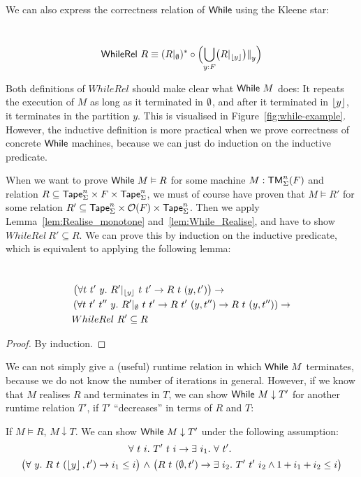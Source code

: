 We can also express the correctness relation of $\textsf{While}$ using the Kleene star:
\begin{lemma}
  ~
  \[
    \textsf{WhileRel}~R \equiv (R {|}_{\emptyset})^* \circ \Bigl( \bigcup_{y:F} \bigl( R {|}_{\left\lfloor {y} \right\rfloor} \bigr) {|\mkern-1.5mu|}_{y} \Bigr)
  \]
\end{lemma}

Both definitions of $WhileRel$ should make clear what $\textsf{While}~M$ does: It repeats the execution of $M$ as long as it terminated in $\emptyset$, and
after it terminated in $\left\lfloor {y} \right\rfloor$, it terminates in the partition $y$.  This is visualised in Figure~\ref{fig:while-example}.  However, the inductive
definition is more practical when we prove correctness of concrete $\textsf{While}$ machines, because we can just do induction on the inductive predicate.

When we want to prove $\textsf{While}~M \vDash R$ for some machine $M:\textsf{TM}_\Sigma^n(F)$ and relation
$R \subseteq \textsf{Tape}_\Sigma^n \times F \times \textsf{Tape}_\Sigma^n$, we must of course have proven that $M \vDash R'$ for some relation
$R' \subseteq \textsf{Tape}_\Sigma^n \times \mathcal{O}(F) \times \textsf{Tape}_\Sigma^n$.  Then we apply Lemma~\ref{lem:Realise_monotone} and~\ref{lem:While_Realise},
and have to show $WhileRel~R' \subseteq R$.  We can prove this by induction on the inductive predicate, which is equivalent to applying the following
lemma:
\begin{lemma}
  \label{lem:WhileInduction}
  ~
  \begin{alignat*}{1}
    & \left(\forall t~t'~y.~R' {|}_{\left\lfloor {y} \right\rfloor}~t~t' \rightarrow R~t~(y,t')\right) \rightarrow \\
    & \left(\forall t~t'~t''~y.~R'{|}_{\emptyset}~t~t' \rightarrow R~t'~(y, t'') \rightarrow R~t~(y,t'')\right) \rightarrow \\
    & WhileRel~R' \subseteq R
  \end{alignat*}
\end{lemma}
\begin{proof}
  By induction.
\end{proof}


We can not simply give a (useful) runtime relation in which $\textsf{While}~M$ terminates, because we do not know the number of iterations in general.
However, if we know that $M$ realises $R$ and terminates in $T$, we can show $\textsf{While}~M \downarrow T'$ for another runtime relation $T'$, if $T'$
``decreases'' in terms of $R$ and $T$:

\begin{lemma}
  \label{lem:While_TerminatesIn}
  If $M \vDash R$, $M \downarrow T$.  We can show $\textsf{While}~M \downarrow T'$ under the following assumption:
  \begin{multline*}
    \forall~t~i.~
    T'~t~i \rightarrow
    \exists~i_1.~
    \forall~t'.~ \\
    \bigl(
    \forall~y.~ R~t~(\left\lfloor {y} \right\rfloor, t') \rightarrow i_1 \le i
    \bigl) ~\land~
    \bigl(
    R~t~(\emptyset, t') \rightarrow
    \exists~i_2.~
    T'~t'~i_2 \land
    1 + i_1 + i_2 \le i
    \bigr)
  \end{multline*}
\end{lemma}

